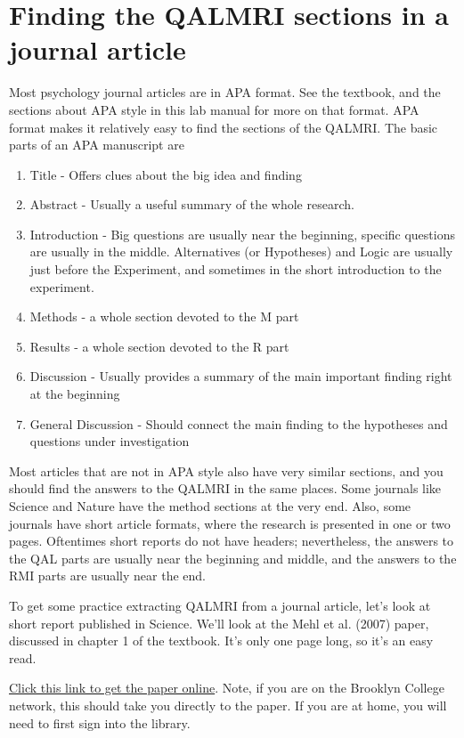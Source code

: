 \section{Finding the QALMRI sections in a journal article}

Most psychology journal articles are in APA format. See the textbook, and the sections about APA style in this lab manual for more on that format. APA format makes it relatively easy to find the sections of the QALMRI. The basic parts of an APA manuscript are 
\begin{enumerate}
\item Title - Offers clues about the big idea and finding
\item Abstract - Usually a useful summary of the whole research.
\item Introduction - Big questions are usually near the beginning, specific questions are usually in the middle. Alternatives (or Hypotheses) and Logic are usually just before the Experiment, and sometimes in the short introduction to the experiment.
\item Methods - a whole section devoted to the M part
\item Results - a whole section devoted to the R part
\item Discussion - Usually provides a summary of the main important finding right at the beginning
\item General Discussion - Should connect the main finding to the hypotheses and questions under investigation
\end{enumerate}

Most articles that are not in APA style also have very similar sections, and you should find the answers to the QALMRI in the same places. Some journals like Science and Nature have the method sections at the very end. Also, some journals have short article formats, where the research is presented in one or two pages. Oftentimes short reports do not have headers; nevertheless, the answers to the QAL parts are usually near the beginning and middle, and the answers to the RMI parts are usually near the end. 

To get some practice extracting QALMRI from a journal article, let's look at short report published in Science. We'll look at the Mehl et al. (2007) \cite{mehl_are_2007} paper, discussed in chapter 1 of the textbook. It's only one page long, so it's an easy read.

 \href{https://login.ez-proxy.brooklyn.cuny.edu/login?url=http://science.sciencemag.org/content/317/5834/82}{Click this link to get the paper online}. Note, if you are on the Brooklyn College network, this should take you directly to the paper. If you are at home, you will need to first sign into the library.

